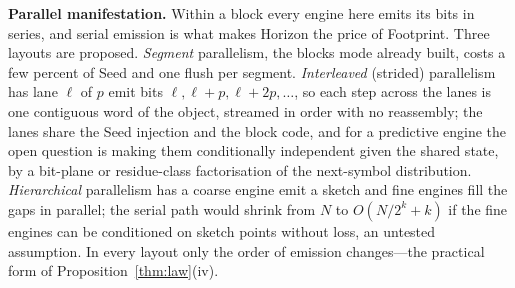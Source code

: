 \documentclass[11pt,a4paper]{article}
\theoremstyle{definition}
\theoremstyle{plain}
\theoremstyle{remark}
\begin{document}
\textbf{Parallel manifestation.} Within a block every engine here emits
its bits in series, and serial emission is what makes Horizon the price of Footprint. Three
layouts are proposed. \emph{Segment} parallelism, the blocks mode already built, costs a few
percent of Seed and one flush per segment. \emph{Interleaved} (strided) parallelism has lane $\ell$ of $p$
emit bits $\ell,\ell{+}p,\ell{+}2p,\dots$, so each step across the lanes is one contiguous word
of the object, streamed in order with no reassembly; the lanes share the Seed injection and the
block code, and for a predictive engine the open question is making them conditionally
independent given the shared state, by a bit-plane or residue-class factorisation of the
next-symbol distribution. \emph{Hierarchical} parallelism has
a coarse engine emit a sketch and fine engines fill the gaps in parallel; the serial path would
shrink from $N$ to $O(N/2^{k}+k)$ if the fine engines can be conditioned on sketch points without
loss, an untested assumption. In every layout only the order of emission changes---the practical
form of Proposition~\ref{thm:law}(iv).

\end{document}
